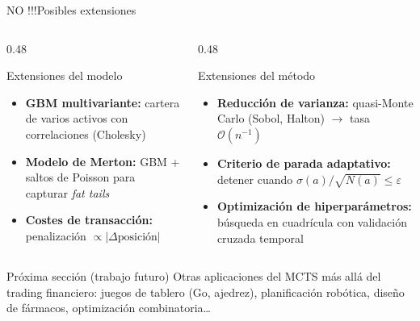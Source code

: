 \documentclass[aspectratio=169, 10pt]{beamer}
\begin{document}
\begin{frame}{NO !!!Posibles extensiones}
  \begin{columns}[T]
    \begin{column}{0.48\textwidth}
      \begin{exampleblock}{Extensiones del modelo}
        \begin{itemize}
          \item \textbf{GBM multivariante:} cartera de varios activos
            con correlaciones (Cholesky)
          \item \textbf{Modelo de Merton:} GBM + saltos de Poisson
            para capturar \emph{fat tails}
          \item \textbf{Costes de transacción:} penalización
            $\propto |\Delta\text{posición}|$
        \end{itemize}
      \end{exampleblock}
    \end{column}
    \begin{column}{0.48\textwidth}
      \begin{exampleblock}{Extensiones del método}
        \begin{itemize}
          \item \textbf{Reducción de varianza:} quasi-Monte Carlo
            (Sobol, Halton) $\to$ tasa $\mathcal{O}(n^{-1})$
          \item \textbf{Criterio de parada adaptativo:}
            detener cuando $\sigma(a)/\sqrt{N(a)} \leq \varepsilon$
          \item \textbf{Optimización de hiperparámetros:}
            búsqueda en cuadrícula con validación cruzada temporal
        \end{itemize}
      \end{exampleblock}
    \end{column}
  \end{columns}

  \vspace{0.4cm}
  \begin{alertblock}{Próxima sección (trabajo futuro)}
    Otras aplicaciones del MCTS más allá del trading financiero:
    juegos de tablero (Go, ajedrez), planificación robótica,
    diseño de fármacos, optimización combinatoria\ldots
  \end{alertblock}
\end{frame}
\end{document}
